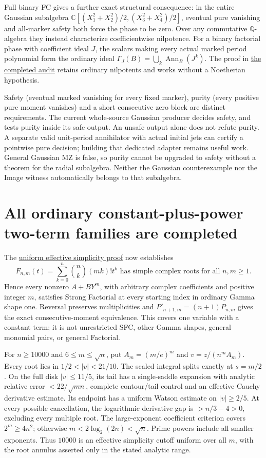 \documentclass[11pt]{article}
\newcommand{\C}{\mathbb C}
\newcommand{\Q}{\mathbb Q}
\begin{document}
Full binary FC gives a further exact structural consequence: in the entire
Gaussian subalgebra
$\C[(X_1^2+X_2^2)/2,(X_3^2+X_4^2)/2]$, eventual pure vanishing and
all-marker safety both force the phase to be zero. Over any commutative
$\Q$-algebra they instead characterize coefficientwise nilpotence.
For a binary factorial phase with coefficient ideal $J$, the scalars
making every actual marked period polynomial form the ordinary ideal
$\Gamma_J(B)=\bigcup_k\operatorname{Ann}_B(J^k)$.
The proof in \href{LONG_EIT_AND_FC2_AUDIT.tex}{the completed audit} retains
ordinary nilpotents and works without a Noetherian hypothesis.

Safety (eventual marked vanishing for every fixed marker), purity
(every positive pure moment vanishes) and a short consecutive zero block
are distinct requirements. The current whole-source Gaussian producer
decides safety, and tests purity inside its safe output. An unsafe output
alone does not refute purity. A separate valid unit-period annihilator
with actual initial jets can certify a pointwise pure decision; building
that dedicated adapter remains useful work. General Gaussian MZ is false,
so purity cannot be upgraded to safety without a theorem for the radial
subalgebra. Neither the Gaussian counterexample nor the Image witness
automatically belongs to that subalgebra.

\section*{All ordinary constant-plus-power two-term families are completed}
The \href{ALL_UNIVARIATE_TWO_TERM_SFC.tex}{uniform effective simplicity proof}
now establishes
\[
 \boxed{F_{n,m}(t)=\sum_{k=0}^n\binom nk(mk)!t^k
        \text{ has simple complex roots for all }n,m\ge1.}
\]
Hence every nonzero $A+BY^m$, with arbitrary complex coefficients and
positive integer $m$, satisfies Strong Factorial at every starting index
in ordinary Gamma shape one. Reversal preserves multiplicities and
$P'_{n+1,m}=(n+1)P_{n,m}$ gives the exact consecutive-moment equivalence.
This covers one variable with a constant term; it is not unrestricted SFC,
other Gamma shapes, general monomial pairs, or general Factorial.

For $n\ge10000$ and $6\le m\le\sqrt n$, put $A_m=(m/e)^m$ and
$v=z/(n^mA_m)$. Every root lies in $1/2<|v|<21/10$.
The scaled integral splits exactly at $s=m/2$. On the full disk
$|v|\le11/5$, its tail has a single-saddle expansion with analytic
relative error $<22/\sqrt{mn}$, complete contour/tail control and an
effective Cauchy derivative estimate. Its endpoint has a uniform Watson
estimate on $|v|\ge2/5$. At every possible cancellation, the logarithmic
derivative gap is $>n/3-4>0$, excluding every multiple root.
The large-exponent coefficient criterion covers $2^m\ge4n^2$; otherwise
$m<2\log_2(2n)<\sqrt n$. Prime powers include all smaller exponents.
Thus $10000$ is an effective simplicity cutoff uniform over all $m$,
with the root annulus asserted only in the stated analytic range.
\end{document}

